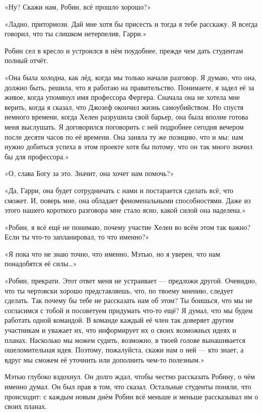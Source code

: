 \documentclass[a4paper,12pt]{book}
\begin{document}
\par
«Ну? Скажи нам, Робин, всё прошло хорошо?»
\par
«Ладно, притормози. Дай мне хотя бы присесть и тогда я тебе расскажу. Я всегда говорил, что ты слишком нетерпелив, Гарри.»
\par
Робин сел в кресло и устроился в нём поудобнее, прежде чем дать студентам полный отчёт.
\par
«Она была холодна, как лёд, когда мы только начали разговор. Я думаю, что она, должно быть, решила, что я работаю на правительство. Понимаете, я задел её за живое, когда упомянул имя профессора Фергера. Сначала она не хотела мне верить, когда я сказал, что Джозеф окончил жизнь самоубийством. Но спустя немного времени, когда Хелен разрушила свой барьер, она была вполне готова меня выслушать. Я договорился поговорить с ней подробнее сегодня вечером после десяти часов по её времени. Она заняла ту же позицию, что и мы: нам нужно добиться успеха в этом проекте хотя бы потому, что он так много значил бы для профессора.»
\par
«О, слава Богу за это. Значит, она хочет нам помочь?»
\par
«Да, Гарри, она будет сотрудничать с нами и постарается сделать всё, что сможет. И, поверь мне, она обладает феноменальными способностями. Даже из этого нашего короткого разговора мне стало ясно, какой силой она наделена.»
\par
«Робин, я всё ещё не понимаю, почему участие Хелен во всём этом так важно? Если ты что-то запланировал, то что именно?»
\par
	«Я пока что не знаю точно, что именно, Мэтью, но я уверен, что нам понадобятся её силы…»
\par
«Робин, прекрати. Этот ответ меня не устраивает — предложи другой. Очевидно, что ты чертовски хорошо представляешь, что, по твоему мнению, следует сделать. Так почему бы тебе не рассказать нам об этом? Ты боишься, что мы не согласимся с тобой и посоветуем придумать что-то ещё? Я думал, что мы будем работать одной командой. В команде каждый её член так доверяет другим участникам и уважает их, что информирует их о своих возможных идеях и планах. Насколько мы можем судить, возможно, в твоей голове вынашивается ошеломительная идея. Поэтому, пожалуйста, скажи нам о ней — кто знает, а вдруг мы сможем её уточнить или дополнить чем-то полезным.»
\par
Мэтью глубоко вздохнул. Он долго ждал, чтобы честно рассказать Робину, о чём именно думал. Он был прав в том, что сказал. Остальные студенты поняли, что происходит: с каждым новым днём Робин всё меньше и меньше рассказывал им о своих планах.
\end{document}
